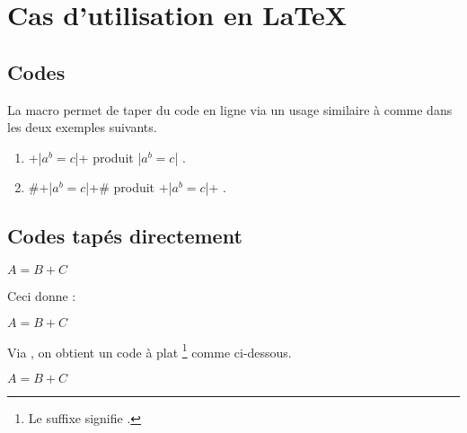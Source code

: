\documentclass[12pt,a4paper]{article}
\begin{document}
\section{Cas d'utilisation en \LaTeX}

\subsection{Codes }

La macro  permet de taper du code en ligne via un usage similaire à  comme dans les deux exemples suivants.

\begin{enumerate}
	\item \docilatex+\docilatex|$a^b = c$|+ produit \docilatex|$a^b = c$| .

	\item \docilatex#\docilatex+\docilatex|$a^b = c$|+# produit \docilatex+\docilatex|$a^b = c$|+ .
\end{enumerate}




\subsection{Codes tapés directement}





\begin{doclatex-alone}
\begin{doclatex}
    $A = B + C$
\end{doclatex}
\end{doclatex-alone}

Ceci donne :

\begin{doclatex}
    $A = B + C$
\end{doclatex}




\docexa[À la suite]

Via , on obtient un code à plat
\footnote{
    Le suffixe  signifie .
}
comme ci-dessous.

\begin{doclatex-flat}
    $A = B + C$
\end{doclatex-flat}
\end{document}
